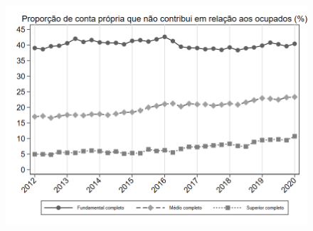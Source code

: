 \begin{frame}[label=_composicao_demografica_educacao_prop_cpropriaNc]{}
\textit{\hyperlink{_composicao_demografica_educacao}{}}
\begin{figure}
  \centering
  \includegraphics[width=1.0\linewidth]{../../analysis/output/composicao_demografica/educacao/_composicao_demografica_educacao_prop_cpropriaNc.png}
  \caption{}
  \label{fig:_composicao_demografica_educacao_prop_cpropriaNc}
\end{figure}
\end{frame}